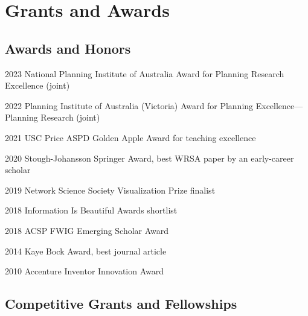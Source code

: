 \documentclass[11pt,letterpaper]{report}
\begin{document}
    \section*{Grants and Awards}

    \subsection*{Awards and Honors}

    \begin{tablist}

        \item[2023] \tab{}National Planning Institute of Australia Award for Planning Research Excellence (joint)
        \item[2022] \tab{}Planning Institute of Australia (Victoria) Award for Planning Excellence---Planning Research (joint)
        \item[2021] \tab{}USC Price ASPD Golden Apple Award for teaching excellence
        \item[2020] \tab{}Stough-Johansson Springer Award, best WRSA paper by an early-career scholar
        \item[2019] \tab{}Network Science Society Visualization Prize finalist
        \item[2018] \tab{}Information Is Beautiful Awards shortlist
        \item[2018] \tab{}ACSP FWIG Emerging Scholar Award
        \item[2014] \tab{}Kaye Bock Award, best journal article
        \item[2010] \tab{}Accenture Inventor Innovation Award

    \end{tablist}

    \subsection*{Competitive Grants and Fellowships}
\end{document}
